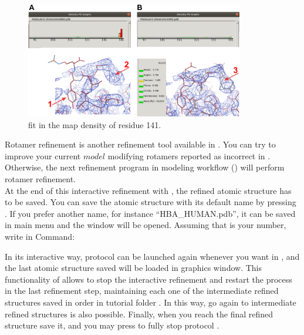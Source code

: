   \begin{figure}[H]
  \centering 
  \captionsetup{width=.7\linewidth} 
  \includegraphics[width=0.85\textwidth]{Images/Fig28}
  \caption{\coot fit in the map density of residue  141.}
  \label{fig:coot_density_fit_analysis2}
  \end{figure}
  
 Rotamer refinement is another refinement tool available in \coot. You can try to improve your current $model$ modifying rotamers reported as incorrect in . Otherwise, the next refinement program in modeling workflow (\phenix {}) will perform rotamer refinement.\\
 
 At the end of this interactive refinement with \coot, the refined atomic structure has to be saved. You can save the atomic structure with its default name by pressing . If you prefer another name, for instance ``HBA\_HUMAN.pdb'', it can be saved in \coot main menu  and the  window will be opened. Assuming that  is your  number, write in Command:\\
 \keys{\return}
 
 In its interactive way,  protocol can be launched again whenever you want in \scipion, and the last atomic structure saved will be loaded in \coot graphics window. This functionality of \scipion allows to stop the interactive refinement and restart the process in the last refinement step, maintaining each one of the intermediate refined structures saved in order in \scipion tutorial folder . In this way, go again to intermediate refined structures is also possible. Finally, when you reach the final refined structure save it, and you may press  to fully stop protocol \coot.\\
 

